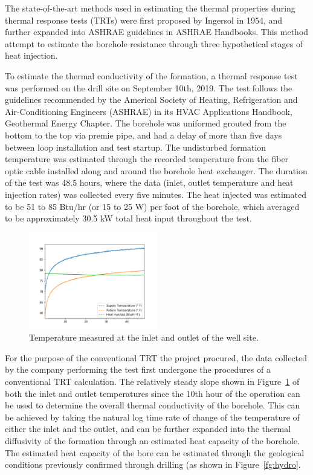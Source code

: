 	The state-of-the-art methods used in estimating the thermal properties during thermal response tests (TRTs) were first proposed by Ingersol in 1954, and further expanded into ASHRAE guidelines in ASHRAE Handbooks. This method attempt to estimate the borehole resistance through three hypothetical stages of heat injection.  
	
	To estimate the thermal conductivity of the formation, a thermal response test was performed on the drill site on September 10th, 2019. The test follows the guidelines recommended by the Americal Society of Heating, Refrigeration and Air-Conditioning Engineers (ASHRAE) in its HVAC Applications Handbook, Geothermal Energy Chapter. The borehole was uniformed grouted from the bottom to the top via premie pipe, and had a delay of more than five days between loop installation and test startup. The undisturbed formation temperature was estimated through the recorded temperature from the fiber optic cable installed along and around the borehole heat exchanger. The duration of the test was 48.5 hours, where the data (inlet, outlet temperature and heat injection rates) was collected every five minutes.  The heat injected was estimated to be 51 to 85 Btu/hr (or 15 to 25 W) per foot of the borehole, which averaged to be approximately 30.5 kW total heat input throughout the test. 

	\begin{figure}
	\centering
	\includegraphics[width=0.5\textwidth]{data/TRTraw}	
	\caption{Temperature measured at the inlet and outlet of the well site.}\label{fg:raw}
	\end{figure}
	
	For the purpose of the conventional TRT the project procured, the data collected by the company performing the test first undergone the procedures of a conventional TRT calculation. The relatively steady slope shown in Figure~\ref{fg:raw} of both the inlet and outlet temperatures since the 10th hour of the operation can be used to determine the overall thermal conductivity of the borehole. This can be achieved by taking the natural log time rate of change of the temperature of either the inlet and the outlet, and can be further expanded into the thermal diffusivity of the formation through an estimated heat capacity of the borehole. The estimated heat capacity of the bore can be estimated through the geological conditions previously confirmed through drilling (as shown in Figure~\ref{fg:hydro}. 	
	
